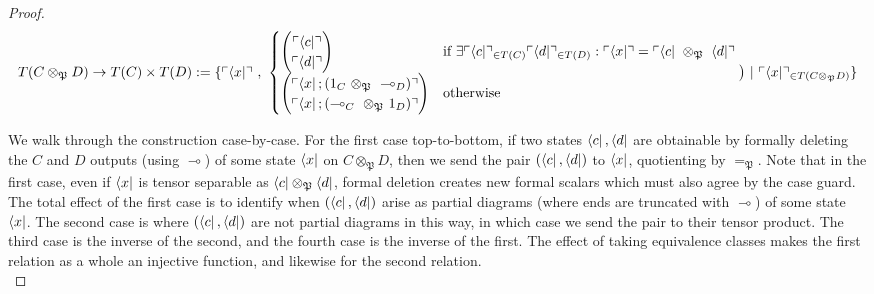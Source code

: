 \begin{fullwidth}
\begin{theorem}
\begin{proof}
\[T(C \otimes_\mathfrak{P} D) \rightarrow T(C) \times T(D) := \{ \ulcorner \bra{x} \urcorner \ , \ \begin{cases} \begin{pmatrix} \ulcorner \bra{c} \urcorner \\ \ulcorner \bra{d} \urcorner \end{pmatrix} & \text{if }\exists \ulcorner \bra{c} \urcorner_{\in T(C)} \ulcorner \bra{d} \urcorner_{\in T(D)}: \ulcorner \bra{x} \urcorner = \ulcorner \bra{c} \ \otimes_\mathfrak{P} \ \bra{d} \urcorner \\ \begin{pmatrix} \ulcorner \bra{x};(1_C \ \otimes_\mathfrak{P} \ \multimap_D) \urcorner \\ \ulcorner \bra{x};(\multimap_C \ \otimes_\mathfrak{P} \ 1_D) \urcorner \end{pmatrix} & \text{otherwise} \end{cases} \big) \ | \ \ulcorner \bra{x} \urcorner_{\in T(C \otimes_\mathfrak{P} D)} \}\]

We walk through the construction case-by-case. For the first case top-to-bottom, if two states $\bra{c},\bra{d}$ are obtainable by formally deleting the $C$ and $D$ outputs (using $\multimap$) of some state $\bra{x}$ on $C \otimes_\mathfrak{P} D$, then we send the pair $(\bra{c},\bra{d})$ to $\bra{x}$, quotienting by $=_\mathfrak{P}$. Note that in the first case, even if $\bra{x}$ is tensor separable as $\bra{c} \otimes_\mathfrak{P} \bra{d}$, formal deletion creates new formal scalars which must also agree by the case guard. The total effect of the first case is to identify when $(\bra{c},\bra{d})$ arise as partial diagrams (where ends are truncated with $\multimap$) of some state $\bra{x}$. The second case is where $(\bra{c},\bra{d})$ are not partial diagrams in this way, in which case we send the pair to their tensor product. The third case is the inverse of the second, and the fourth case is the inverse of the first. The effect of taking equivalence classes makes the first relation as a whole an injective function, and likewise for the second relation.\\


\end{proof}
\end{theorem}
\end{fullwidth}
